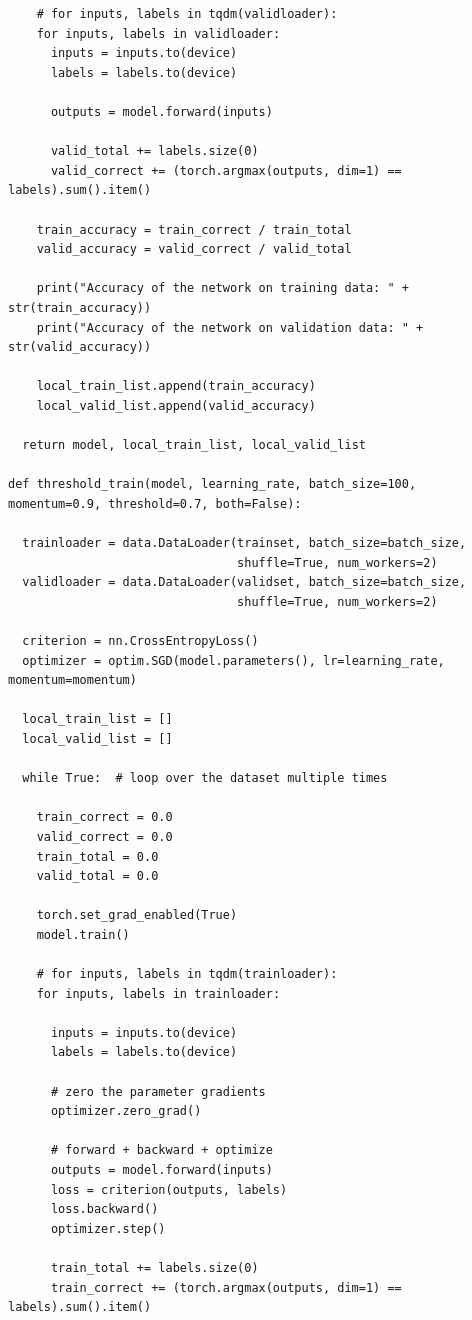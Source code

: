 \documentclass{article}
\newcommand{\1}{\mathbf{1}}
\begin{document}
{\begin{verbatim}
    # for inputs, labels in tqdm(validloader):
    for inputs, labels in validloader:
      inputs = inputs.to(device)
      labels = labels.to(device)

      outputs = model.forward(inputs)
        
      valid_total += labels.size(0)
      valid_correct += (torch.argmax(outputs, dim=1) == labels).sum().item()

    train_accuracy = train_correct / train_total
    valid_accuracy = valid_correct / valid_total

    print("Accuracy of the network on training data: " + str(train_accuracy))
    print("Accuracy of the network on validation data: " + str(valid_accuracy))

    local_train_list.append(train_accuracy)
    local_valid_list.append(valid_accuracy)

  return model, local_train_list, local_valid_list

def threshold_train(model, learning_rate, batch_size=100, momentum=0.9, threshold=0.7, both=False):
  
  trainloader = data.DataLoader(trainset, batch_size=batch_size,
                                shuffle=True, num_workers=2)
  validloader = data.DataLoader(validset, batch_size=batch_size,
                                shuffle=True, num_workers=2)

  criterion = nn.CrossEntropyLoss()
  optimizer = optim.SGD(model.parameters(), lr=learning_rate, momentum=momentum)

  local_train_list = []
  local_valid_list = []

  while True:  # loop over the dataset multiple times

    train_correct = 0.0
    valid_correct = 0.0
    train_total = 0.0
    valid_total = 0.0

    torch.set_grad_enabled(True)
    model.train()

    # for inputs, labels in tqdm(trainloader):
    for inputs, labels in trainloader:

      inputs = inputs.to(device)
      labels = labels.to(device)

      # zero the parameter gradients
      optimizer.zero_grad()

      # forward + backward + optimize
      outputs = model.forward(inputs)
      loss = criterion(outputs, labels)
      loss.backward()
      optimizer.step()
        
      train_total += labels.size(0)
      train_correct += (torch.argmax(outputs, dim=1) == labels).sum().item()
    

\end{verbatim}}
\end{document}
